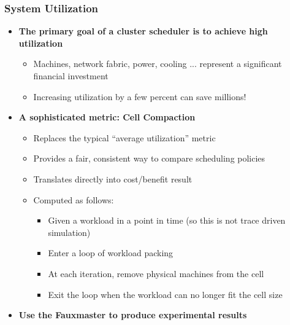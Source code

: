 \begin{frame}
\frametitle{System Utilization}
\begin{itemize}
	\item {\bf The primary goal of a cluster scheduler is to achieve high utilization}
	\begin{itemize}
		\item Machines, network fabric, power, cooling ... represent a significant financial investment
		\item Increasing utilization by a few percent can save millions!
	\end{itemize}
	\item {\bf A sophisticated metric: Cell Compaction}
	\begin{itemize}
		\item Replaces the typical ``average utilization'' metric
		\item Provides a fair, consistent way to compare scheduling policies
		\item Translates directly into cost/benefit result
		\item Computed as follows:
		\begin{itemize}
			\item Given a workload in a point in time (so this is not trace driven simulation)
			\item Enter a loop of workload packing
			\item At each iteration, remove physical machines from the cell
			\item Exit the loop when the workload can no longer fit the cell size
		\end{itemize}
	\end{itemize}
	\item {\bf Use the Fauxmaster to produce experimental results}
\end{itemize}
\end{frame}

